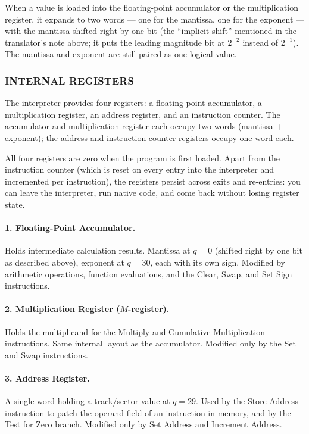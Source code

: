 \medskip
When a value is loaded into the floating-point accumulator or the multiplication register, it expands to two words --- one for the mantissa, one for the exponent --- with the mantissa shifted right by one bit (the ``implicit shift'' mentioned in the translator's note above; it puts the leading magnitude bit at $2^{-2}$ instead of $2^{-1}$). The mantissa and exponent are still paired as one logical value.

\subsubsection*{INTERNAL REGISTERS}
The interpreter provides four registers: a floating-point accumulator, a multiplication register, an address register, and an instruction counter. The accumulator and multiplication register each occupy two words (mantissa + exponent); the address and instruction-counter registers occupy one word each.

All four registers are zero when the program is first loaded. Apart from the instruction counter (which is reset on every entry into the interpreter and incremented per instruction), the registers persist across exits and re-entries: you can leave the interpreter, run native code, and come back without losing register state.

\paragraph{1. Floating-Point Accumulator.} Holds intermediate calculation results. Mantissa at $q=0$ (shifted right by one bit as described above), exponent at $q=30$, each with its own sign. Modified by arithmetic operations, function evaluations, and the Clear, Swap, and Set Sign instructions.

\paragraph{2. Multiplication Register ($M$-register).} Holds the multiplicand for the Multiply and Cumulative Multiplication instructions. Same internal layout as the accumulator. Modified only by the Set and Swap instructions.

\paragraph{3. Address Register.} A single word holding a track/sector value at $q=29$. Used by the Store Address instruction to patch the operand field of an instruction in memory, and by the Test for Zero branch. Modified only by Set Address and Increment Address.

